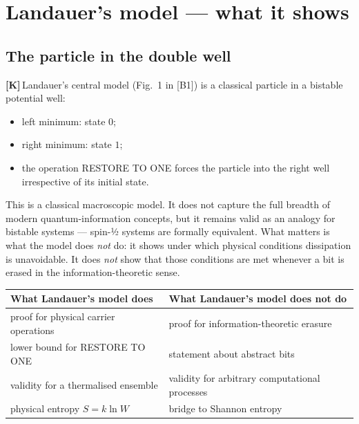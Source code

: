 \documentclass[11pt,a4paper]{article}
\newcommand{\LK}{\textcolor{layK}{\textbf{\footnotesize\textsf{[K]}}}\,}
\theoremstyle{ffgft}
\begin{document}
\section{Landauer's model --- what it shows}

\subsection{The particle in the double well}

\LK Landauer's central model (Fig.~1 in [B1]) is a classical particle in a
bistable potential well:

\begin{itemize}[leftmargin=1.4em,itemsep=0.2em]
  \item left minimum: state $0$;
  \item right minimum: state $1$;
  \item the operation \textup{RESTORE TO ONE} forces the particle into the right
        well irrespective of its initial state.
\end{itemize}

This is a classical macroscopic model. It does not capture the full breadth of
modern quantum-information concepts, but it remains valid as an analogy for
bistable systems --- spin-½ systems are formally equivalent. What matters is what
the model does \emph{not} do: it shows under which physical conditions dissipation
is unavoidable. It does \emph{not} show that those conditions are met whenever a
bit is erased in the information-theoretic sense.

\begin{center}
\small
\begin{tabular}{@{}p{}p{}@{}}
\toprule
\textbf{What Landauer's model does} & \textbf{What Landauer's model does not do} \\
\midrule
proof for physical carrier operations & proof for information-theoretic erasure \\
lower bound for \textup{RESTORE TO ONE} & statement about abstract bits \\
validity for a thermalised ensemble & validity for arbitrary computational processes \\
physical entropy $S = k\ln W$ & bridge to Shannon entropy \\
\bottomrule
\end{tabular}
\end{center}
\end{document}
